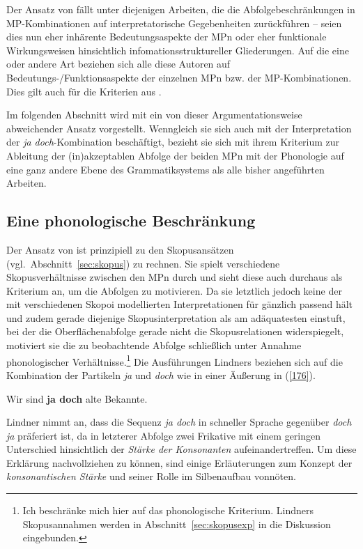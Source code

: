 Der Ansatz von \citet{Vriendt1991} fällt unter diejenigen Arbeiten, die die Abfolgebeschränkungen in MP-Kom\-bi\-na\-ti\-on\-en auf interpretatorische Gegebenheiten zurückführen – seien dies nun eher inhärente Bedeutungsaspekte der MPn oder eher funktionale Wirkungsweisen hinsichtlich infomationsstruktureller Gliederungen. Auf die eine oder andere Art beziehen sich alle diese Autoren auf Bedeutungs-/Funktionsaspekte der einzelnen MPn bzw. der MP-Kom\-bi\-na\-ti\-on\-en. Dies gilt auch für die Kriterien aus \citet{Thurmair1989, Thurmair1991}. 

Im folgenden Abschnitt wird mit \citet{Lindner1991} ein von dieser Argumentationsweise abweichender Ansatz vorgestellt. Wenngleich sie sich auch mit der Interpretation der \textit{ja doch}-Kombination beschäftigt, bezieht sie sich mit ihrem Kriterium zur Ableitung der (in)akzeptablen Abfolge der beiden MPn mit der Phonologie auf eine ganz andere Ebene des Grammatiksystems als alle bisher angeführten Arbeiten.

\subsection{Eine phonologische Beschränkung}
\label{sec:phon}
Der Ansatz von \citet{Lindner1991} ist prinzipiell zu den Skopusansätzen (vgl.\ Abschnitt~\ref{sec:skopus}) zu rechnen. Sie spielt verschiedene Skopusverhältnisse  zwischen den MPn durch und sieht diese auch durchaus als Kriterium an, um die Abfolgen zu motivieren. Da sie letztlich jedoch keine der mit verschiedenen Skopoi modellierten Interpretationen für gänzlich passend hält und zudem gerade diejenige Skopusinterpretation als am adäquatesten einstuft, bei der die Oberflächenabfolge gerade nicht die Skopusrelationen widerspiegelt, motiviert sie die zu beobachtende Abfolge schließlich unter Annahme phonologischer Verhältnisse.\footnote{Ich beschränke mich hier auf das phonologische Kriterium. Lindners Skopusannahmen werden in Abschnitt~\ref{sec:skopusexp} in die Diskussion eingebunden.} Die Ausführungen Lindners beziehen sich auf die Kombination der Partikeln \textit{ja} und \textit{doch} wie in einer Äußerung in (\ref{176}).

\begin{exe}
	\ex\label{176} 
	Wir sind \textbf{ja doch} alte Bekannte.
\end{exe}
Lindner nimmt an, dass die Sequenz \textit{ja doch} in schneller Sprache gegenüber \textit{doch ja} präferiert ist, da in letzterer Abfolge zwei Frikative mit einem geringen Unterschied hinsichtlich der \textit{Stärke der Konsonanten} aufeinandertreffen. Um diese Erklärung nachvollziehen zu können, sind einige Erläuterungen zum Konzept der \textit{konsonantischen Stärke} und seiner Rolle im Silbenaufbau vonnöten.

